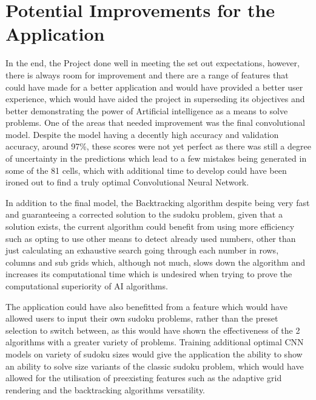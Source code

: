 \documentclass[]{final_report}
\begin{document}
\section{Potential Improvements for the Application}
In the end, the Project done well in meeting the set out expectations, however, there is always room for improvement and there are a range of features that could have made for a better application and would have provided a better user experience, which would have aided the project in superseding its objectives and better demonstrating the power of Artificial intelligence as a means to solve problems. One of the areas that needed improvement was the final convolutional model. Despite the model having a decently high accuracy and validation accuracy, around 97\%, these scores were not yet perfect as there was still a degree of uncertainty in the predictions which lead to a few mistakes being generated in some of the 81 cells, which with additional time to develop could have been ironed out to find a truly optimal Convolutional Neural Network. 

In addition to the final model, the Backtracking algorithm despite being very fast and guaranteeing a corrected solution to the sudoku problem, given that a solution exists, the current algorithm could benefit from using more efficiency such as opting to use other means to detect already used numbers, other than just calculating an exhaustive search going through each number in rows, columns and sub grids which, although not much, slows down the algorithm and increases its computational time which is undesired when trying to prove the computational superiority of AI algorithms. 

The application could have also benefitted from a feature which would have allowed users to input their own sudoku problems, rather than the preset selection to switch between, as this would have shown the effectiveness of the 2 algorithms with a greater variety of problems. Training additional optimal CNN models on variety of sudoku sizes would give the application the ability to show an ability to solve size variants of the classic sudoku problem, which would have allowed for the utilisation of preexisting features such as the adaptive grid rendering and the backtracking algorithms versatility. 

\end{document}
